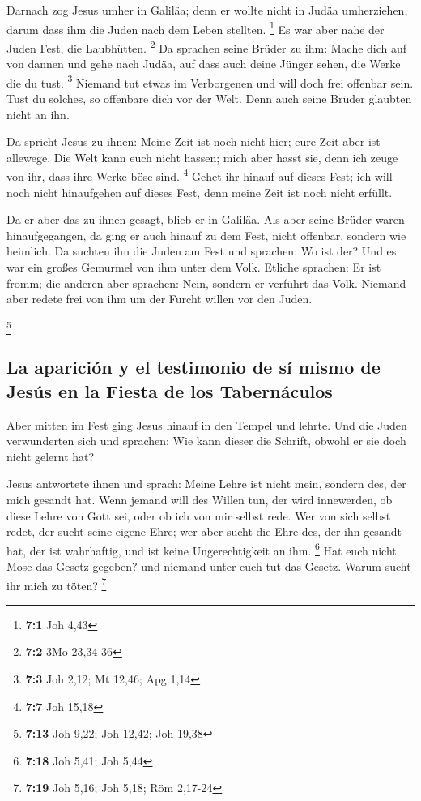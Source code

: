  Darnach zog Jesus umher in Galiläa; denn er wollte nicht
in Judäa umherziehen, darum dass ihm die Juden nach dem Leben stellten.
\footnote{\textbf{7:1} Joh 4,43}  Es war aber nahe der
Juden Fest, die Laubhütten. \footnote{\textbf{7:2} 3Mo 23,34-36}
 Da sprachen seine Brüder zu ihm: Mache dich auf von
dannen und gehe nach Judäa, auf dass auch deine Jünger sehen, die Werke
die du tust. \footnote{\textbf{7:3} Joh 2,12; Mt 12,46; Apg 1,14}
 Niemand tut etwas im Verborgenen und will doch frei
offenbar sein. Tust du solches, so offenbare dich vor der Welt.
 Denn auch seine Brüder glaubten nicht an ihn.

 Da spricht Jesus zu ihnen: Meine Zeit ist noch nicht
hier; eure Zeit aber ist allewege.  Die Welt kann euch
nicht hassen; mich aber hasst sie, denn ich zeuge von ihr, dass ihre
Werke böse sind. \footnote{\textbf{7:7} Joh 15,18}  Gehet
ihr hinauf auf dieses Fest; ich will noch nicht hinaufgehen auf dieses
Fest, denn meine Zeit ist noch nicht erfüllt.

 Da er aber das zu ihnen gesagt, blieb er in Galiläa.
 Als aber seine Brüder waren hinaufgegangen, da ging er
auch hinauf zu dem Fest, nicht offenbar, sondern wie heimlich.
 Da suchten ihn die Juden am Fest und sprachen: Wo ist
der?  Und es war ein großes Gemurmel von ihm unter dem
Volk. Etliche sprachen: Er ist fromm; die anderen aber sprachen: Nein,
sondern er verführt das Volk.  Niemand aber redete frei
von ihm um der Furcht willen vor den Juden.

\footnote{\textbf{7:13} Joh 9,22; Joh 12,42; Joh 19,38}

\hypertarget{la-apariciuxf3n-y-el-testimonio-de-suxed-mismo-de-jesuxfas-en-la-fiesta-de-los-tabernuxe1culos}{%
\subsection{La aparición y el testimonio de sí mismo de Jesús en la
Fiesta de los
Tabernáculos}\label{la-apariciuxf3n-y-el-testimonio-de-suxed-mismo-de-jesuxfas-en-la-fiesta-de-los-tabernuxe1culos}}

 Aber mitten im Fest ging Jesus hinauf in den Tempel und
lehrte.  Und die Juden verwunderten sich und sprachen:
Wie kann dieser die Schrift, obwohl er sie doch nicht gelernt hat?

 Jesus antwortete ihnen und sprach: Meine Lehre ist nicht
mein, sondern des, der mich gesandt hat.  Wenn jemand
will des Willen tun, der wird innewerden, ob diese Lehre von Gott sei,
oder ob ich von mir selbst rede.  Wer von sich selbst
redet, der sucht seine eigene Ehre; wer aber sucht die Ehre des, der ihn
gesandt hat, der ist wahrhaftig, und ist keine Ungerechtigkeit an ihm.
\footnote{\textbf{7:18} Joh 5,41; Joh 5,44}  Hat euch
nicht Mose das Gesetz gegeben? und niemand unter euch tut das Gesetz.
Warum sucht ihr mich zu töten? \footnote{\textbf{7:19} Joh 5,16; Joh
  5,18; Röm 2,17-24}

